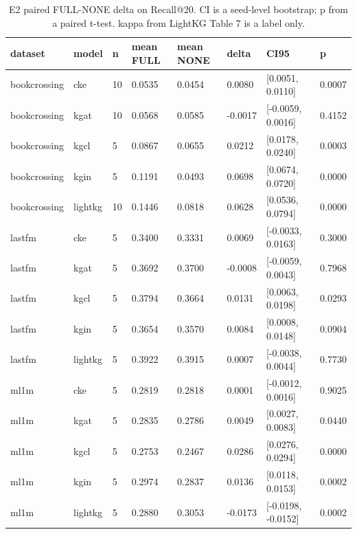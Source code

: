 \begin{table}[t]
\centering
\caption{E2 paired FULL-NONE delta on Recall@20. CI is a seed-level bootstrap; p from a paired t-test. kappa from LightKG Table 7 is a label only.}
\label{tab:e2}
\begin{tabular}{llllllll}
\hline
dataset & model & n & mean FULL & mean NONE & delta & CI95 & p \\
\hline
bookcrossing & cke & 10 & 0.0535 & 0.0454 & 0.0080 & [0.0051, 0.0110] & 0.0007 \\
bookcrossing & kgat & 10 & 0.0568 & 0.0585 & -0.0017 & [-0.0059, 0.0016] & 0.4152 \\
bookcrossing & kgcl & 5 & 0.0867 & 0.0655 & 0.0212 & [0.0178, 0.0240] & 0.0003 \\
bookcrossing & kgin & 5 & 0.1191 & 0.0493 & 0.0698 & [0.0674, 0.0720] & 0.0000 \\
bookcrossing & lightkg & 10 & 0.1446 & 0.0818 & 0.0628 & [0.0536, 0.0794] & 0.0000 \\
lastfm & cke & 5 & 0.3400 & 0.3331 & 0.0069 & [-0.0033, 0.0163] & 0.3000 \\
lastfm & kgat & 5 & 0.3692 & 0.3700 & -0.0008 & [-0.0059, 0.0043] & 0.7968 \\
lastfm & kgcl & 5 & 0.3794 & 0.3664 & 0.0131 & [0.0063, 0.0198] & 0.0293 \\
lastfm & kgin & 5 & 0.3654 & 0.3570 & 0.0084 & [0.0008, 0.0148] & 0.0904 \\
lastfm & lightkg & 5 & 0.3922 & 0.3915 & 0.0007 & [-0.0038, 0.0044] & 0.7730 \\
ml1m & cke & 5 & 0.2819 & 0.2818 & 0.0001 & [-0.0012, 0.0016] & 0.9025 \\
ml1m & kgat & 5 & 0.2835 & 0.2786 & 0.0049 & [0.0027, 0.0083] & 0.0440 \\
ml1m & kgcl & 5 & 0.2753 & 0.2467 & 0.0286 & [0.0276, 0.0294] & 0.0000 \\
ml1m & kgin & 5 & 0.2974 & 0.2837 & 0.0136 & [0.0118, 0.0153] & 0.0002 \\
ml1m & lightkg & 5 & 0.2880 & 0.3053 & -0.0173 & [-0.0198, -0.0152] & 0.0002 \\
\hline
\end{tabular}
\end{table}

